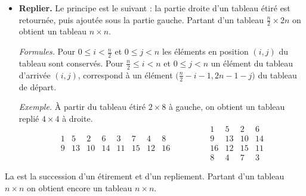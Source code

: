 \documentclass[11pt,class=report,crop=false]{standalone}
\begin{document}
\begin{cours}
\begin{itemize}
  \item \textbf{Replier.} Le principe est le suivant : la partie droite d'un tableau étiré est retournée, puis ajoutée sous la partie gauche. Partant d'un tableau $\frac n2 \times 2n$ on obtient un tableau $n \times n$.

 

\emph{Formules.} 
Pour $0 \le i < \frac n2$ et $0 \le j < n$ les éléments en position $(i,j)$ du tableau sont conservés.
Pour $\frac n2 \le i < n$ et $0 \le j < n$ un élément du tableau 
d'arrivée $(i,j)$, correspond à un élément $\big(\frac{n}{2} - i - 1,2n-1-j\big)$ du tableau de départ. 


\emph{Exemple.} 
À partir du tableau étiré $2 \times 8$ à gauche, on obtient un tableau replié $4 \times 4$ à droite. 
$$ 
\begin{array}{cccccccc} 
  1& 5& 2& 6& 3& 7& 4& 8  \\
  9&13&10&14&11&15&12&16
\end{array}\qquad\qquad
\begin{array}{cccc} 
  1& 5& 2& 6\\ 
  9& 13& 10& 14\\  
  16&12&15&11\\  
  8&4&7&3  
\end{array}$$
\end{itemize}


La  est la succession d'un étirement et d'un repliement. Partant d'un tableau $n \times n$ on obtient encore un tableau $n \times n$.



\end{cours}
\end{document}
